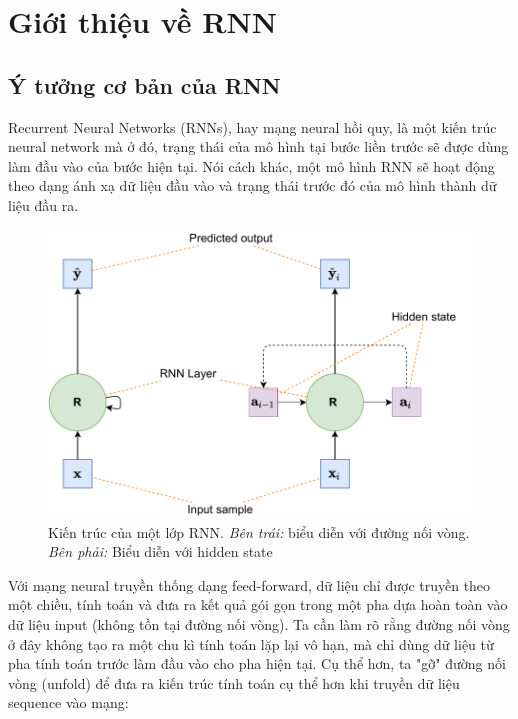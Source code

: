 
\section{Giới thiệu về RNN}

\subsection{Ý tưởng cơ bản của RNN}
Recurrent Neural Networks (RNNs), hay mạng neural hồi quy, là một kiến trúc neural network mà ở đó, trạng thái của mô hình tại bước liền trước sẽ được dùng làm đầu vào của bước hiện tại. Nói cách khác, một mô hình RNN sẽ hoạt động theo dạng ánh xạ dữ liệu đầu vào và trạng thái trước đó của mô hình thành dữ liệu đầu ra.

\begin{figure}[!h]
    \centering
    \includegraphics[width=\textwidth,height=\textheight,keepaspectratio]{books/artificial-neural-network/chapter06/figure-sec2345/rnn.pdf}
    \caption{Kiến trúc của một lớp RNN. \emph{Bên trái:} biểu diễn với đường nối vòng. \emph{Bên phải:} Biểu diễn với hidden state}
\end{figure}

Với mạng neural truyền thống dạng feed-forward, dữ liệu chỉ được truyền theo một chiều, tính toán và đưa ra kết quả gói gọn trong một pha dựa hoàn toàn vào dữ liệu input (không tồn tại đường nối vòng). Ta cần làm rõ rằng đường nối vòng ở đây không tạo ra một chu kì tính toán lặp lại vô hạn, mà chỉ dùng dữ liệu từ pha tính toán trước làm đầu vào cho pha hiện tại. Cụ thể hơn, ta "gỡ" đường nối vòng (unfold) để đưa ra kiến trúc tính toán cụ thể hơn khi truyền dữ liệu sequence vào mạng:

